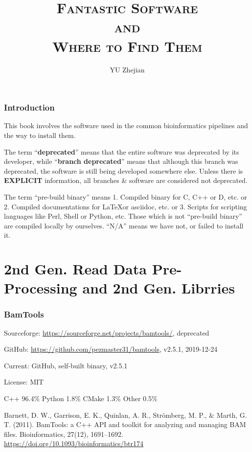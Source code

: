 \documentclass[]{article}
\begin{document}
\title{\fontsize{40}{40}\selectfont\scshape Fantastic Software\\{\Huge and}\\Where to Find Them}
\author{YU Zhejian}
\maketitle
\setcounter{section}{-1}
\section{Introduction}

This book involves the software used in the common bioinformatics pipelines and the way to install them.

The term ``\textbf{deprecated}'' means that the entire software was deprecated by its developer, while ``\textbf{branch deprecated}'' means that although this branch was deprecated, the software is still being developed somewhere else. Unless there is \textbf{EXPLICIT} information, all branches \& software are considered not deprecated.

The term ``pre-build binary'' means 1. Compiled binary for C, C++ or D, etc. or 2. Compiled documentations for \LaTeX or asciidoc, etc. or 3. Scripts for scripting languages like Perl, Shell or Python, etc. Those which is not ``pre-build binary'' are compiled locally by ourselves. ``N/A'' means we have not, or failed to install it.

\tableofcontents

\part{2nd Gen. Read Data Pre-Processing and 2nd Gen. Librries}

\section{BamTools}

Sourceforge: \url{https://sourceforge.net/projects/bamtools/}, deprecated

GitHub: \url{https://github.com/pezmaster31/bamtools}, v2.5.1, 2019-12-24

Current: GitHub, self-built binary, v2.5.1

License: MIT

C++ 96.4\% Python 1.8\% CMake 1.3\% Other 0.5\%

Barnett, D. W., Garrison, E. K., Quinlan, A. R., Strömberg, M. P., \& Marth, G. T. (2011). BamTools: a C++ API and toolkit for analyzing and managing BAM files. Bioinformatics, 27(12), 1691–1692. \url{https://doi.org/10.1093/bioinformatics/btr174}
\end{document}
